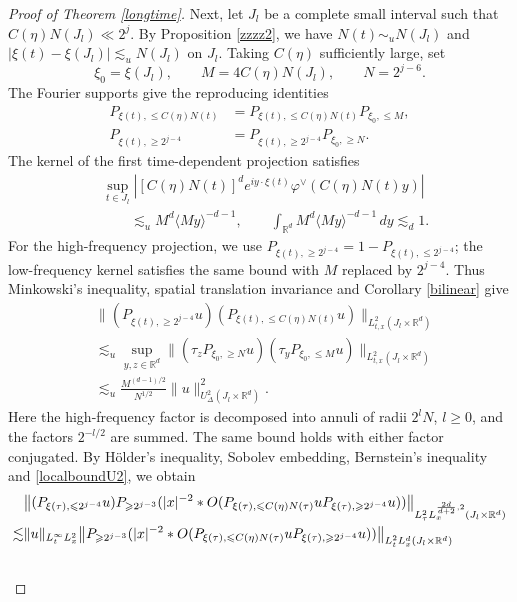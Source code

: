 \documentclass[reqno,11pt]{amsart}
\theoremstyle{plain}
\theoremstyle{definition}
\numberwithin{equation}{section}
\numberwithin{theorem}{section}
\def\geq{\geqslant}
\def\leq{\leqslant}
\def\R{\mathbb{R}}
\begin{document}
\begin{proof}[Proof of Theorem \ref{longtime}]
Next, let $J_l$ be a complete small interval such that
$C(\eta)N(J_l)\ll2^j$. By Proposition \ref{zzzz2}, we have
$N(t)\sim_u N(J_l)$ and
$|\xi(t)-\xi(J_l)|\lesssim_u N(J_l)$ on $J_l$. Taking $C(\eta)$
sufficiently large, set
\[
 \xi_0=\xi(J_l),\qquad M=4C(\eta)N(J_l),\qquad N=2^{j-6}.
\]
The Fourier supports give the reproducing identities
\begin{align*}
 P_{\xi(t),\leq C(\eta)N(t)}
 &=P_{\xi(t),\leq C(\eta)N(t)}P_{\xi_0,\leq M},\\
 P_{\xi(t),\geq2^{j-4}}
 &=P_{\xi(t),\geq2^{j-4}}P_{\xi_0,\geq N}.
\end{align*}
The kernel of the first time-dependent projection satisfies
\begin{align*}
 &\sup_{t\in J_l}\left|
 [C(\eta)N(t)]^d e^{iy\cdot\xi(t)}
       \varphi^\vee(C(\eta)N(t)y)\right|\\
 &\qquad\lesssim_u M^d\langle My\rangle^{-d-1},\qquad
 \int_{\R^d}M^d\langle My\rangle^{-d-1}\,dy\lesssim_d1.
\end{align*}
For the high-frequency projection, we use
$P_{\xi(t),\geq2^{j-4}}=1-P_{\xi(t),\leq2^{j-4}}$; the low-frequency
kernel satisfies the same bound with $M$ replaced by $2^{j-4}$.
Thus Minkowski's inequality, spatial translation invariance and
Corollary \ref{bilinear} give
\begin{align*}
 &\|(P_{\xi(t),\geq2^{j-4}}u)
        (P_{\xi(t),\leq C(\eta)N(t)}u)\|_{L_{t,x}^2(J_l\times\R^d)}\\
 &\lesssim_u\sup_{y,z\in\R^d}
       \|(\tau_zP_{\xi_0,\geq N}u)
         (\tau_yP_{\xi_0,\leq M}u)\|_{L_{t,x}^2(J_l\times\R^d)}\\
 &\lesssim_u \frac{M^{(d-1)/2}}{N^{1/2}}
                  \|u\|_{U_\Delta^2(J_l\times\R^d)}^2.
\end{align*}
Here the high-frequency factor is decomposed into annuli of radii
$2^lN$, $l\geq0$, and the factors $2^{-l/2}$ are summed. The same bound
holds with either factor conjugated. By H\"older's inequality, Sobolev
embedding, Bernstein's inequality and \eqref{localboundU2}, we obtain
\begin{align}\notag
&\big\|(P_{\xi(\tau),\leq 2^{j-4}}u)P_{\geq 2^{j-3}}(|x|^{-2}\ast O(P_{\xi(\tau),\leq C(\eta)N(\tau)}uP_{\xi(\tau),\geq 2^{j-4}}u))\big\|_{L_{\tau}^2L_x^{\frac{2d}{d+2},2}(J_l\times\R^d)}\\\notag
\lesssim&\|u\|_{L_t^\infty L_x^2} \big\|P_{\geq 2^{j-3}}(|x|^{-2}\ast O(P_{\xi(\tau),\leq C(\eta)N(\tau)}uP_{\xi(\tau),\geq 2^{j-4}}u))\big\|_{L_t^2L_x^d(J_l\times\R^d)}\\\notag

\end{align}
\end{proof}
\end{document}
